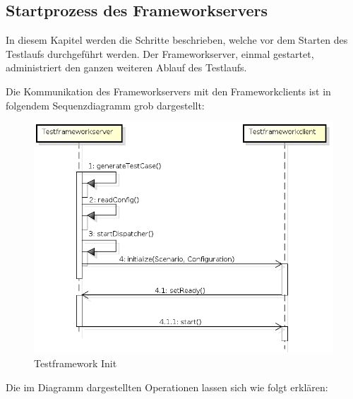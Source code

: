 \subsection{Startprozess des Frameworkservers}
\label{sec:startFramework}
In diesem Kapitel werden die Schritte beschrieben, welche vor dem Starten des Testlaufs durchgeführt werden. Der Frameworkserver, einmal gestartet, administriert den ganzen weiteren Ablauf des Testlaufs. 

Die Kommunikation des Frameworkservers mit den Frameworkclients ist in folgendem Sequenzdiagramm grob dargestellt:

\begin{figure}[H]
\begin{center}
\includegraphics[scale=0.7]{image_testFramework/TestFWInit.png}
\end{center}
\caption{Testframework Init}
\end{figure}

Die im Diagramm dargestellten Operationen lassen sich wie folgt erklären:

